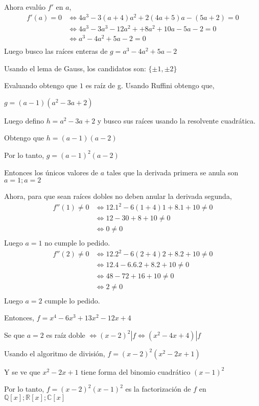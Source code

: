 Ahora evalúo $f'$ en $a$,
\begin{align*}
    f'(a) = 0 &\iff 4a^3 - 3(a+4)a^2 + 2(4a+5)a-(5a+2) = 0 \\ 
    &\iff 4a^3 - 3a^3 - 12a^2 + +8a^2 + 10a -5a - 2 = 0 \\ 
    &\iff a^3 - 4a^2 + 5a - 2 = 0 \\ 
\end{align*}
Luego busco las raíces enteras de $ g = a^3 - 4a^2 + 5a - 2 $

Usando el lema de Gauss, los candidatos son: $ \{ \pm 1, \pm 2 \} $

Evaluando obtengo que $1$ es raíz de g. Usando Ruffini obtengo que,

$ g = (a-1)(a^2-3a+2) $

Luego defino $ h = a^2-3a+2 $ y busco sus raíces usando la resolvente cuadrática.

Obtengo que $ h = (a-1)(a-2) $

Por lo tanto, $ g = (a-1)^2(a-2) $

Entonces los únicos valores de $a$ tales que la derivada primera se anula son $ a = 1; a = 2 $

Ahora, para que sean raíces dobles no deben anular la derivada segunda,
\begin{align*}
    f''(1) \neq 0 &\iff 12.1^2 - 6(1+4)1 + 8.1 + 10 \neq 0 \\
    &\iff 12 - 30 + 8 + 10 \neq 0 \\
    &\iff 0 \neq 0 \\
\end{align*}
Luego $ a = 1 $ no cumple lo pedido.
\begin{align*}
    f''(2) \neq 0 &\iff 12.2^2 - 6(2+4)2 + 8.2 + 10 \neq 0 \\
    &\iff 12.4 - 6.6.2 + 8.2 + 10 \neq 0 \\
    &\iff 48 - 72 + 16 + 10 \neq 0 \\
    &\iff 2 \neq 0 \\
\end{align*}
Luego $ a = 2 $ cumple lo pedido.

Entonces, $ f = x^4 - 6x^3 + 13x^2 - 12x + 4 $

Se que $ a = 2 $ es raíz doble $ \iff (x-2)^2 | f \iff (x^2-4x+4) | f $

Usando el algoritmo de división, $ f = (x-2)^2(x^2-2x+1) $

Y se ve que $ x^2-2x+1 $ tiene forma del binomio cuadrático $ (x-1)^2 $

Por lo tanto, $ f = (x-2)^2(x-1)^2 $ es la factorización de $f$ en $ \mathbb{Q}[x]; \mathbb{R}[x]; \mathbb{C}[x] $

